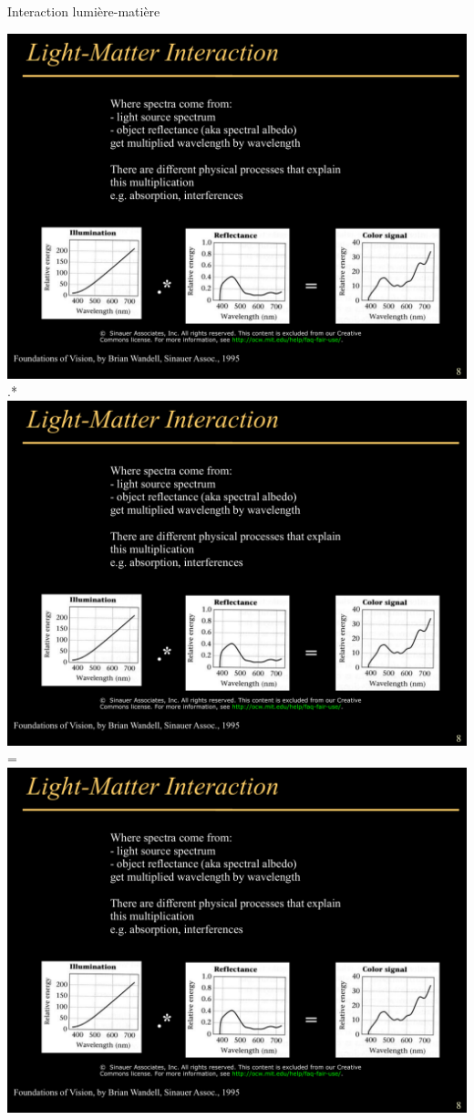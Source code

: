 \begin{frame}{Interaction lumière-matière}
\begin{center}
\includegraphics[height=.3\textheight]{figs/lumillum.pdf}
{\Huge .*}
\includegraphics[height=.3\textheight]{figs/lumref.pdf}
{\Huge =}
\includegraphics[height=.3\textheight]{figs/lumsig.pdf}


\end{center}
\end{frame}
